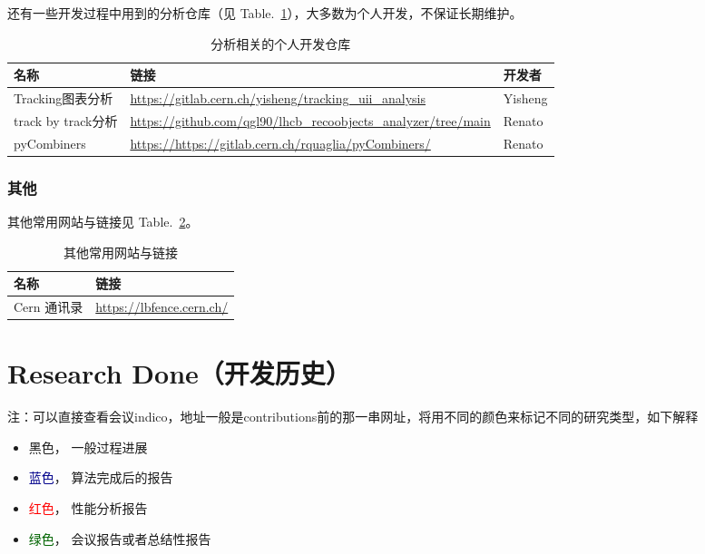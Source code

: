 \documentclass[UTF8]{article}
\newcommand{\blue}[1]{\textcolor{darkblue}{#1}}
\newcommand{\red}[1]{\textcolor{red}{#1}}
\newcommand{\green}[1]{\textcolor{darkgreen}{#1}}
\begin{document}
还有一些开发过程中用到的分析仓库（见 Table.~\ref{tab:ana-repos}），大多数为个人开发，不保证长期维护。

\begin{table}[htbp]
  \centering
  \caption{分析相关的个人开发仓库}
  \label{tab:ana-repos}
  \begin{tabular}{lll}
    \toprule
    名称 & 链接 & 开发者 \\
    \midrule
    Tracking图表分析 & \url{https://gitlab.cern.ch/yisheng/tracking_uii_analysis} & Yisheng \\
    track by track分析 & \url{https://github.com/qgl90/lhcb_recoobjects_analyzer/tree/main} & Renato \\
    pyCombiners \footnotemark[3] & \url{https://https://gitlab.cern.ch/rquaglia/pyCombiners/} & Renato \\
    \bottomrule
  \end{tabular}
\end{table}




\subsubsection{其他}
其他常用网站与链接见 Table.~\ref{tab:useful-links-other}。
\begin{table}[htbp]
  \centering
  \caption{其他常用网站与链接}
  \label{tab:useful-links-other}
  \begin{tabular}{ll}
    \toprule
    名称 & 链接 \\
    \midrule
    Cern 通讯录 & \url{https://lbfence.cern.ch/} \\
    \bottomrule
  \end{tabular}
\end{table}


\section{Research Done（开发历史）}

注：可以直接查看会议indico，地址一般是contributions前的那一串网址，将用不同的颜色来标记不同的研究类型，如下解释

\begin{itemize}
  \item 黑色， 一般过程进展
  \item \blue{蓝色}， 算法完成后的报告
  \item \red{红色}， 性能分析报告
  \item \green{绿色}， 会议报告或者总结性报告
\end{itemize}
\end{document}
